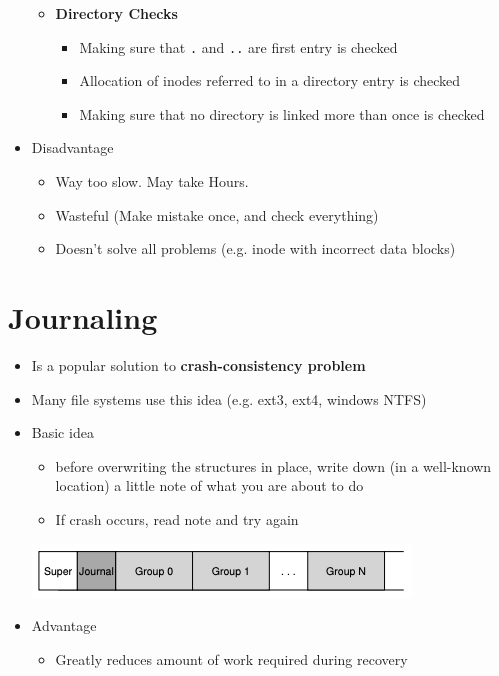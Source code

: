 \documentclass[12pt]{article}
\begin{document}
\begin{itemize}
\begin{itemize}
        \item \textbf{Directory Checks}

        \begin{itemize}
            \item Making sure that \texttt{.} and \texttt{..} are first entry is checked
            \item Allocation of inodes referred to in a directory entry is checked
            \item Making sure that no directory is linked more than once is checked
        \end{itemize}
    \end{itemize}

    \item Disadvantage
    \begin{itemize}
        \item Way too slow. May take Hours.
        \item Wasteful (Make mistake once, and check everything)
        \item Doesn't solve all problems (e.g. inode with incorrect data blocks)
    \end{itemize}
\end{itemize}

\section{Journaling}
\begin{itemize}
    \item Is a popular solution to \textbf{crash-consistency problem}
    \item Many file systems use this idea (e.g. ext3, ext4, windows NTFS)
    \item Basic idea

    \begin{itemize}
        \item before overwriting the structures in place, write down
        (in a well-known location) a little note of what you are about to do
        \item If crash occurs, read note and try again
    \end{itemize}

    \bigskip

    \begin{center}
    \includegraphics[width=0.8\linewidth]{../images/midterm_4_solution_34.png}
    \end{center}

    \item Advantage

    \begin{itemize}
        \item Greatly reduces amount of work required during recovery
    \end{itemize}
\end{itemize}
\end{document}
